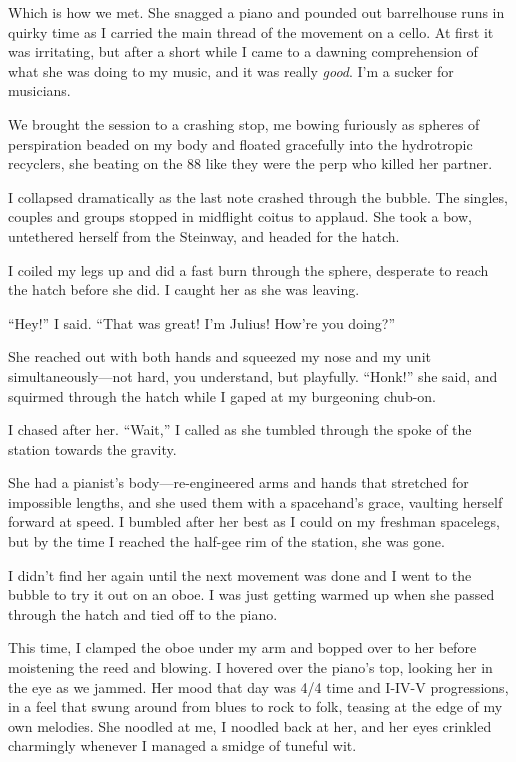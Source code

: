 Which is how we met. She snagged a piano and pounded out
barrelhouse runs in quirky time as I carried the main thread of the
movement on a cello. At first it was irritating, but after a short
while I came to a dawning comprehension of what she was doing to my
music, and it was really \emph{good}. I'm a sucker for musicians.

We brought the session to a crashing stop, me bowing furiously as
spheres of perspiration beaded on my body and floated gracefully
into the hydrotropic recyclers, she beating on the 88 like they
were the perp who killed her partner.

I collapsed dramatically as the last note crashed through the
bubble. The singles, couples and groups stopped in midflight coitus
to applaud. She took a bow, untethered herself from the Steinway,
and headed for the hatch.

I coiled my legs up and did a fast burn through the sphere,
desperate to reach the hatch before she did. I caught her as she
was leaving.

“Hey!” I said. “That was great! I'm Julius! How're you doing?”

She reached out with both hands and squeezed my nose and my unit
simultaneously—not hard, you understand, but playfully. “Honk!” she
said, and squirmed through the hatch while I gaped at my burgeoning
chub-on.

I chased after her. “Wait,” I called as she tumbled through the
spoke of the station towards the gravity.

She had a pianist's body—re-engineered arms and hands that
stretched for impossible lengths, and she used them with a
spacehand's grace, vaulting herself forward at speed. I bumbled
after her best as I could on my freshman spacelegs, but by the time
I reached the half-gee rim of the station, she was gone.

I didn't find her again until the next movement was done and I went
to the bubble to try it out on an oboe. I was just getting warmed
up when she passed through the hatch and tied off to the piano.

This time, I clamped the oboe under my arm and bopped over to her
before moistening the reed and blowing. I hovered over the piano's
top, looking her in the eye as we jammed. Her mood that day was 4/4
time and I-IV-V progressions, in a feel that swung around from
blues to rock to folk, teasing at the edge of my own melodies. She
noodled at me, I noodled back at her, and her eyes crinkled
charmingly whenever I managed a smidge of tuneful wit.


